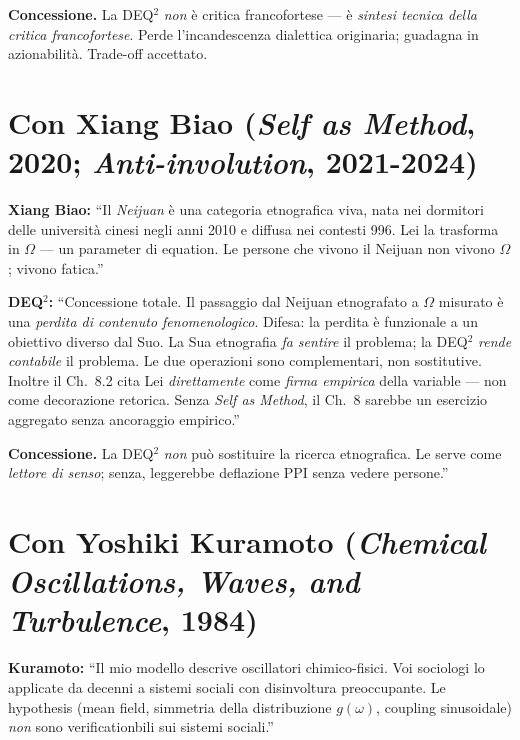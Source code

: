 \textbf{Concessione.} La DEQ$^2$ \emph{non} è critica francofortese --- è
\emph{sintesi tecnica della critica francofortese}. Perde
l'incandescenza dialettica originaria; guadagna in azionabilità.
Trade-off accettato.



\section{\texorpdfstring{Con Xiang Biao (\emph{Self as Method}, 2020;
\emph{Anti-involution},
2021-2024)}{Con Xiang Biao (Self as Method, 2020; Anti-involution, 2021-2024)}}\label{con-xiang-biao-self-as-method-2020-anti-involution-2021-2024}

\textbf{Xiang Biao:} ``Il \emph{Neijuan} è una categoria etnografica
viva, nata nei dormitori delle università cinesi negli anni 2010 e
diffusa nei contesti 996. Lei la trasforma in \(\Omega\) --- un
parameter di equation. Le persone che vivono il Neijuan non vivono
\(\Omega\); vivono fatica.''

\textbf{DEQ$^2$:} ``Concessione totale. Il passaggio dal Neijuan
etnografato a \(\Omega\) misurato è una \emph{perdita di contenuto
fenomenologico}. Difesa: la perdita è funzionale a un obiettivo diverso
dal Suo. La Sua etnografia \emph{fa sentire} il problema; la DEQ$^2$
\emph{rende contabile} il problema. Le due operazioni sono
complementari, non sostitutive. Inoltre il Ch.~8.2 cita Lei
\emph{direttamente} come \emph{firma empirica} della variable --- non
come decorazione retorica. Senza \emph{Self as Method}, il Ch.~8
sarebbe un esercizio aggregato senza ancoraggio empirico.''

\textbf{Concessione.} La DEQ$^2$ \emph{non} può sostituire la ricerca
etnografica. Le serve come \emph{lettore di senso}; senza, leggerebbe
deflazione PPI senza vedere persone.''



\section{\texorpdfstring{Con Yoshiki Kuramoto (\emph{Chemical
Oscillations, Waves, and Turbulence},
1984)}{Con Yoshiki Kuramoto (Chemical Oscillations, Waves, and Turbulence, 1984)}}\label{con-yoshiki-kuramoto-chemical-oscillations-waves-and-turbulence-1984}

\textbf{Kuramoto:} ``Il mio modello descrive oscillatori chimico-fisici.
Voi sociologi lo applicate da decenni a sistemi sociali con disinvoltura
preoccupante. Le hypothesis (mean field, simmetria della distribuzione
\(g(\omega)\), coupling sinusoidale) \emph{non} sono verificationbili
sui sistemi sociali.''

